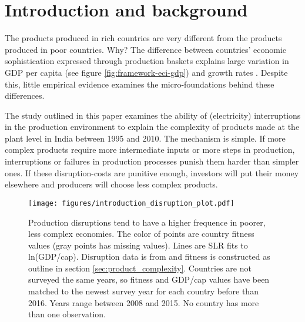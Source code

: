 \section{Introduction and background}\label{sec:introduction_and_background}

The products produced in rich countries are very different from the products
produced in poor countries. Why? The difference between countries' economic
sophistication expressed through production baskets explains large variation in
GDP per capita (see figure \ref{fig:framework-eci-gdp}) and growth rates \citep{tacchella_dynamical_2018}. Despite this, little empirical evidence examines the micro-foundations behind these differences.

The study outlined in this paper examines the ability of (electricity) interruptions in the production environment to explain the complexity of products made at the plant level in India between 1995 and 2010. The mechanism is simple. If more complex products require more intermediate inputs or more steps in production, interruptions or failures in production processes punish them harder than simpler ones. If these disruption-costs are punitive enough, investors will put their money elsewhere and producers will choose less complex products.

\begin{figure}[htpb]
	\centering
	\texttt{[image: figures/introduction\_disruption\_plot.pdf]}
	\caption{Production disruptions tend to have a higher frequence in poorer, less complex economies. The color of points are country fitness values (gray points has missing values). Lines are SLR fits to ln(GDP/cap). Disruption data is from \cite{the_world_bank_enterprise_2019} and fitness is constructed as outline in section \ref{sec:product_complexity}. Countries are not surveyed the same years, so fitness and GDP/cap values have been matched to the newest survey year for each country before than 2016. Years range between 2008 and 2015. No country has more than one observation.}
	\label{fig:disruption-fig}
\end{figure}


